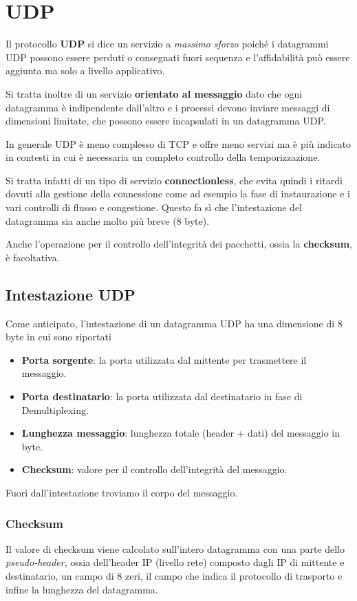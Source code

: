 \section{UDP}
Il protocollo \textbf{UDP} si dice un servizio a \emph{massimo sforzo} 
poiché i datagrammi UDP possono essere perduti o consegnati fuori 
sequenza e l'affidabilità può essere aggiunta ma solo a livello 
applicativo.

Si tratta inoltre di un servizio \textbf{orientato al messaggio} dato 
che ogni datagramma è indipendente dall'altro e i processi devono 
inviare messaggi di dimensioni limitate, che possono essere incapsulati 
in un datagramma UDP.

In generale UDP è meno complesso di TCP e offre meno servizi ma è più 
indicato in contesti in cui è necessaria un completo controllo della 
temporizzazione.

Si tratta infatti di un tipo di servizio \textbf{connectionless}, che 
evita quindi i ritardi dovuti alla gestione della connessione come ad 
esempio la fase di instaurazione e i vari controlli di flusso e 
congestione. Questo fa sì che l'intestazione del datagramma sia anche 
molto più breve (8 byte).

Anche l'operazione per il controllo dell'integrità dei pacchetti, ossia 
la \textbf{checksum}, è facoltativa.

\subsection{Intestazione UDP}
Come anticipato, l'intestazione di un datagramma UDP ha una dimensione 
di 8 byte in cui sono riportati
\begin{itemize}
	\item \textbf{Porta sorgente}: la porta utilizzata dal mittente 
		per trasmettere il messaggio.
	\item \textbf{Porta destinatario}: la porta utilizzata dal 
		destinatario in fase di Demultiplexing.
	\item \textbf{Lunghezza messaggio}: lunghezza totale (header + 
		dati) del messaggio in byte.
	\item \textbf{Checksum}: valore per il controllo dell'integrità 
		del messaggio.
\end{itemize}
Fuori dall'intestazione troviamo il corpo del messaggio.

\subsubsection{Checksum}
Il valore di checksum viene calcolato sull'intero datagramma con una 
parte dello \emph{pseudo-header}, ossia dell'header IP (livello rete) 
composto dagli IP di mittente e destinatario, un campo di 8 zeri, il 
campo che indica il protocollo di trasporto e infine la lunghezza del 
datagramma.

